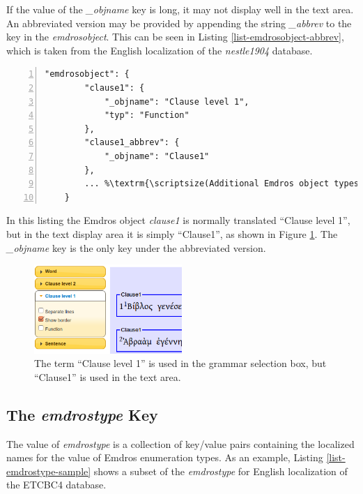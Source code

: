 \documentclass[11pt,oneside,a4paper]{memoir}
\begin{document}
If the value of the \emph{\_objname} key is long, it may not display well in the text area. An
abbreviated version may be provided by appending the string \emph{\_abbrev} to the key in the
\emph{emdrosobject}. This can be seen in Listing \ref{list-emdrosobject-abbrev}, which is taken from
the English localization of the \emph{nestle1904} database.

\begin{lstlisting}[numbers=left,caption=An abbreviated emdrosobject name,label=list-emdrosobject-abbrev]
    "emdrosobject": {
        "clause1": {
            "_objname": "Clause level 1",
            "typ": "Function"
        },
        "clause1_abbrev": {
            "_objname": "Clause1"
        },
        ... %\textrm{\scriptsize(Additional Emdros object types omitted)}%
    }
\end{lstlisting}

In this listing the Emdros object \emph{clause1} is normally translated ``Clause level 1'', but in
the text display area it is simply ``Clause1'', as shown in Figure \ref{fig-clause1}. The
\emph{\_objname} key is the only key under the abbreviated version.

\begin{figure}[h]
  \begin{center}
    \parbox{0.5\textwidth}{
      \includegraphics[width=0.5\textwidth]{clause1.png}
      \caption{The term ``Clause level 1'' is used in the grammar selection box, but ``Clause1'' is
        used in the text area.}\label{fig-clause1}
    }
  \end{center}
\end{figure}


\subsection{The \emph{emdrostype} Key}\label{enum-loc}

The value of \emph{emdrostype} is a collection of key/value pairs containing the localized names for
the value of Emdros enumeration types. As an example, Listing \ref{list-emdrostype-sample} shows
a subset of the \emph{emdrostype} for English localization of the ETCBC4 database.
\end{document}
